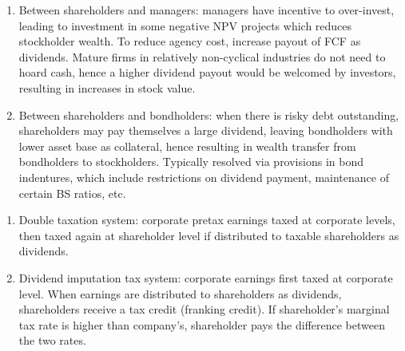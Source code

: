 \begin{remark} 
\begin{enumerate}[label=\roman*.]
\setlength{\itemsep}{0pt}
\item Between shareholders and managers: managers have incentive to over-invest, leading to investment in some negative NPV projects which reduces stockholder wealth. To reduce agency cost, increase payout of FCF as dividends. Mature firms in relatively non-cyclical industries do not need to hoard cash, hence a higher dividend payout would be welcomed by investors, resulting in increases in stock value.
\item Between shareholders and bondholders: when there is risky debt outstanding, shareholders may pay themselves a large dividend, leaving bondholders with lower asset base as collateral, hence resulting in wealth transfer from bondholders to stockholders. Typically resolved via provisions in bond indentures, which include restrictions on dividend payment, maintenance of certain BS ratios, etc.
\end{enumerate}
\end{remark}

\begin{definition} 
\begin{enumerate}[label=\roman*.]
\setlength{\itemsep}{0pt}
\item Double taxation system: corporate pretax earnings taxed at corporate levels, then taxed again at shareholder level if distributed to taxable shareholders as dividends.
\item Dividend imputation tax system: corporate earnings first taxed at corporate level. When earnings are distributed to shareholders as dividends, shareholders receive a tax credit (franking credit). If shareholder's marginal tax rate is higher than company's, shareholder pays the difference between the two rates.
\end{enumerate}
\end{definition}

